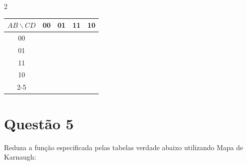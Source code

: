 \documentclass[12pt,a4paper]{article}
\begin{document}
\begin{multicols}{2}
\begin{enumerate}[label=\alph*)]
\begin{minipage}[t]{\linewidth}
    \begin{center}
      \begin{tabular}{c|c|c|c|c|}
        $AB \backslash CD$ & 00 & 01 & 11 & \multicolumn{1}{c}{10} \\
        \hline
        00 & \phantom{0} & \phantom{0} & \phantom{0} & \phantom{0} \\
        \hline
        01 & \phantom{0} & \phantom{0} & \phantom{0} & \phantom{0} \\
        \hline
        11 & \phantom{0} & \phantom{0} & \phantom{0} & \phantom{0} \\
        \hline
        10 & \phantom{0} & \phantom{0} & \phantom{0} & \phantom{0} \\
        \cline{2-5}
      \end{tabular}
    \end{center}
  \end{minipage}

\end{enumerate}
\end{multicols}

\section{Questão 5}

Reduza a função especificada pelas tabelas verdade abaixo utilizando Mapa de Karnaugh:
\end{document}
